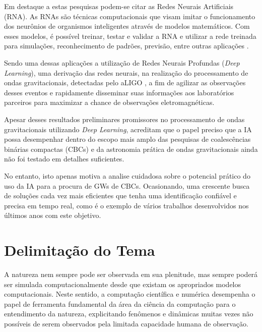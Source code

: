 Em destaque a estas pesquisas podem-se citar as Redes Neurais Artificiais (RNA). As RNAs são técnicas computacionais que visam imitar o funcionamento dos neurônios de organismos inteligentes através de modelos matemáticos. Com esses modelos, é possível treinar, testar e validar a RNA e utilizar a rede treinada para simulações, reconhecimento de padrões, previsão, entre outras aplicações \cite{haykin2011neural}.

Sendo uma dessas aplicações a utilização de Redes Neurais Profundas (\textit{Deep Learning}), uma derivação das redes neurais, na realização do processamento de ondas gravitacionais, detectadas pelo aLIGO \cite{shen2017denoising,PhysRevLett.120.141103,krastev2019real,gebhard2019convolutional,mukund2017transient,kim2015application, george2017deep, george2018deep, PhysRevD.100.103025, Lin2019, Luo2020}, a fim de agilizar as observações desses eventos e rapidamente disseminar suas informações aos laboratórios parceiros para maximizar a chance de observações eletromagnéticas.

Apesar desses resultados preliminares promissores no processamento de ondas gravitacionais utilizando \textit{Deep Learning}, \cite{PhysRevD.100.063015} acreditam que o papel preciso que a IA possa desempenhar dentro do escopo mais amplo das pesquisas de coalescências binárias compactas (CBCs) e da astronomia prática de ondas gravitacionais ainda não foi testado em detalhes suficientes.

No entanto, isto apenas motiva a analise cuidadosa sobre o potencial prático do uso da IA para a procura de GWs de CBCs. Ocasionando, uma crescente busca de soluções cada vez mais eficientes que tenha uma identificação confiável e precisa em tempo real, como é o exemplo de vários trabalhos desenvolvidos nos últimos anos com este objetivo.
    
\section{Delimitação do Tema}
\label{sec:delimitacao-do-tema}

A natureza nem sempre pode ser observada em sua plenitude, mas sempre poderá ser simulada computacionalmente desde que existam os apropriados modelos computacionais. Neste sentido, a computação científica e numérica desempenha o papel de ferramenta fundamental da área da ciência da computação para o entendimento da natureza, explicitando fenômenos e dinâmicas muitas vezes não possíveis de serem observados pela limitada capacidade humana de observação.

